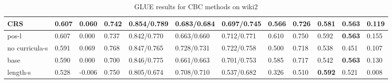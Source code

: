\begin{table}[h]
{\begin{tabular}{|l|l|l|l|l|l|l|l|l|l|l|l|}
CRS & 0.607 & 0.060 & 0.742 & 0.854/0.789 & 0.683/0.684 & 0.697/0.745 & 0.566 & 0.726 & 0.581 & \textbf{0.563} & 0.119 \\\hline
pos-l & 0.607 & 0.000 & 0.737 & 0.842/0.770 & 0.663/0.660 & 0.712/0.771 & 0.610 & 0.750 & 0.592 & \textbf{0.563} & 0.155 \\\hline
no curricula-s & 0.591 & 0.069 & 0.768 & 0.847/0.765 & 0.728/0.731 & 0.722/0.758 & 0.500 & 0.718 & 0.538 & 0.451 & 0.107 \\\hline
base & 0.590 & 0.000 & 0.700 & 0.846/0.775 & 0.661/0.663 & 0.701/0.753 & 0.585 & 0.717 & 0.542 & \textbf{0.563} & 0.130 \\\hline
length-s & 0.528 & -0.006 & 0.750 & 0.805/0.674 & 0.708/0.710 & 0.537/0.682 & 0.326 & 0.510 & \textbf{0.592} & 0.521 & 0.008 \\ \hline
\end{tabular}%
}
\caption{GLUE results for CBC methods on wiki2}
\label{tab:wiki2-glue}
\end{table}

